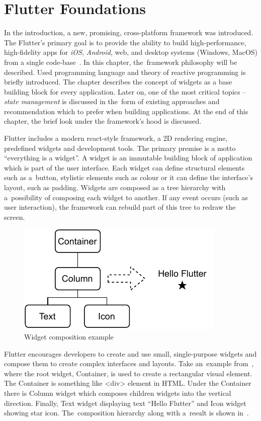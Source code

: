 \chapter{Flutter Foundations}
\label{ch:flutter}
In the introduction, a new, promising, cross-platform framework was introduced. The Flutter's primary goal is to provide the ability to build high-performance, high-fidelity apps for \textit{iOS}, \textit{Android}, web, and desktop systems (Windows, MacOS) from a single code-base~\cite{flutter-technical-overview}. In this chapter, the~framework philosophy will be described. Used programming language and theory of reactive programming is briefly introduced. The chapter describes the concept of widgets as a base building block for every application. Later on, one of the most critical topics -- \textit{state management} is discussed in the~form of existing approaches and recommendation which to prefer when building applications. At the end of this chapter, the brief look under the framework's hood is discussed.

Flutter includes a modern react-style framework, a 2D rendering engine, predefined widgets and development tools. The primary premise is a motto ``everything is a widget''. A widget is an immutable building block of application which is part of the user interface. Each widget can define structural elements such as a~button, stylistic elements such as colour or it can define the interface's layout, such as padding. Widgets are composed as a tree hierarchy with a~possibility of composing each widget to another. If any event occurs (such as user interaction), the framework can rebuild part of this tree to redraw the screen.  

\begin{figure}[htp]
    \centering
    \includegraphics[width=0.5\linewidth]{img/flutter/hello-flutter.pdf}
    \caption{Widget composition example}
    \label{fig:hello-flutter}
\end{figure}

Flutter encourages developers to create and use small, single-purpose widgets and compose them to create complex interfaces and layouts. Take an~example from~, where the root widget, Container, is used to create a rectangular visual element. The Container is something like <div> element in HTML. Under the Container there is Column widget which composes children widgets into the vertical direction. Finally, Text widget displaying text ``Hello Flutter'' and Icon widget showing star icon. The~composition hierarchy along with a~result is shown in~.

